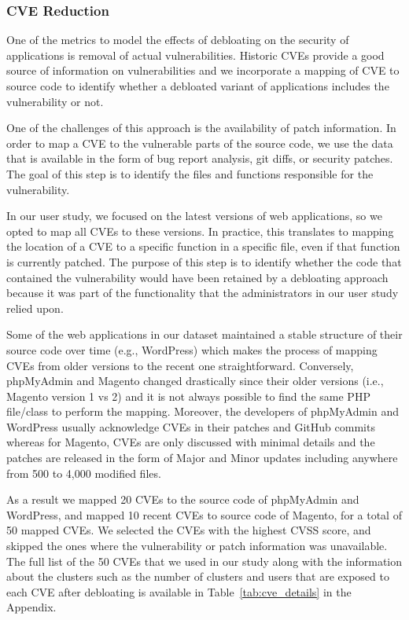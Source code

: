 \subsubsection{CVE Reduction}

One of the metrics to model the effects of debloating on the security of applications is removal of actual vulnerabilities. 
Historic CVEs provide a good source of information on vulnerabilities and we incorporate a mapping of CVE to source code to identify whether a debloated variant of applications includes the vulnerability or not. 

One of the challenges of this approach is the availability of patch information. 
In order to map a CVE to the vulnerable parts of the source code, we use the data that is available in the form of bug report analysis, git diffs, or security patches. 
The goal of this step is to identify the files and functions responsible for the vulnerability. 

In our user study, we focused on the latest versions of web applications, so we opted to map all CVEs to these versions. 
In practice, this translates to mapping the location of a CVE to a specific function in a specific file, even if that function is currently patched. 
The purpose of this step is to identify whether the code that contained the vulnerability would have been retained by a debloating approach because it was part of the functionality that the administrators in our user study relied upon.

Some of the web applications in our dataset maintained a stable structure of their source code over time (e.g., WordPress) which makes the process of mapping CVEs from older versions to the recent one straightforward. 
Conversely, phpMyAdmin and Magento changed drastically since their older versions (i.e., Magento version 1 vs 2) and it is not always possible to find the same PHP file/class to perform the mapping. 
Moreover, the developers of phpMyAdmin and WordPress usually acknowledge CVEs in their patches and GitHub commits whereas for Magento, CVEs are only discussed with minimal details and the patches are released in the form of Major and Minor updates including anywhere from 500 to 4,000 modified files.

As a result we mapped 20 CVEs to the source code of phpMyAdmin and WordPress, and mapped 10 recent CVEs to source code of Magento, for a total of 50 mapped CVEs. 
We selected the CVEs with the highest CVSS score, and skipped the ones where the vulnerability or patch information was unavailable. 
The full list of the 50 CVEs that we used in our study along with the information about the \sys{} clusters such as the number of clusters and users that are exposed to each CVE after debloating is available in Table~\ref{tab:cve_details} in the Appendix. 

